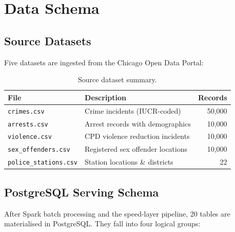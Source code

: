 \documentclass[11pt,a4paper]{article}
\begin{document}
\section{Data Schema}

\subsection{Source Datasets}

Five datasets are ingested from the Chicago Open Data Portal:

\begin{table}[H]
\centering
\caption{Source dataset summary.}
\label{tab:sources}
\begin{tabular}{@{}llr@{}}
\toprule
\textbf{File} & \textbf{Description} & \textbf{Records} \\
\midrule
\texttt{crimes.csv}          & Crime incidents (IUCR-coded) & 50{,}000 \\
\texttt{arrests.csv}         & Arrest records with demographics & 10{,}000 \\
\texttt{violence.csv}        & CPD violence reduction incidents & 10{,}000 \\
\texttt{sex\_offenders.csv}  & Registered sex offender locations & 10{,}000 \\
\texttt{police\_stations.csv} & Station locations \& districts & 22 \\
\bottomrule
\end{tabular}
\end{table}

\subsection{PostgreSQL Serving Schema}

After Spark batch processing and the speed-layer pipeline, 20 tables are
materialised in PostgreSQL. They fall into four logical groups:
\end{document}

